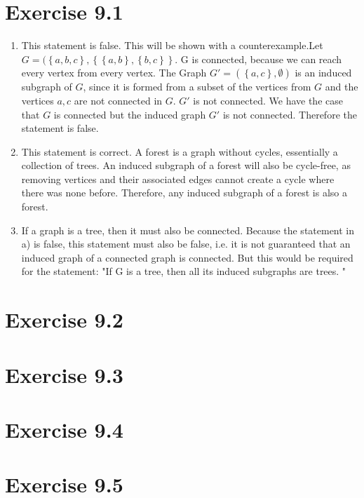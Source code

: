 \documentclass{article} %
\newcommand{\homeworkNumber}{9}
\begin{document}
\section*{Exercise \homeworkNumber.1}
\begin{enumerate}
	\item This statement is false. This will be shown with a counterexample.Let \( G =  (\left\{ a,b,c \right\},\left\{ \left\{ a,b \right\}, \left\{ b,c \right\}  \right\}    \). G is connected, because we can reach every vertex from every vertex. The Graph \( G' = (\left\{ a,c \right\}, \emptyset) \) is an induced subgraph of \( G \), since it is formed from a subset of the vertices from \( G \) and the vertices \( a,c \) are not connected in \( G \). \( G' \) is not connected. We have the case that \( G \) is connected but the induced graph \( G' \) is not connected. Therefore the statement is false.
	\item This statement is correct. A forest is a graph without cycles, essentially a collection of trees. An induced subgraph of a forest will also be cycle-free, as removing vertices and their associated edges cannot create a cycle where there was none before. Therefore, any induced subgraph of a forest is also a forest.
	\item If a graph is a tree, then it must also be connected. Because the statement in a) is false, this statement must also be false, i.e. it is not guaranteed that an induced graph of a connected graph is connected. But this would be required for the statement: "If G is a tree, then all its induced subgraphs are trees. "
\end{enumerate}

\section*{Exercise \homeworkNumber.2}


\section*{Exercise \homeworkNumber.3}


\section*{Exercise \homeworkNumber.4}

\section*{Exercise \homeworkNumber.5}
\end{document}
